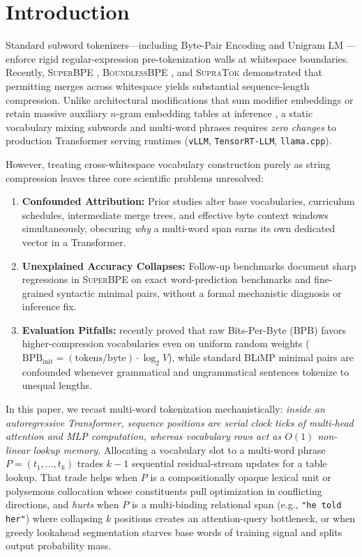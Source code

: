 \documentclass[11pt,a4paper]{article}
\begin{document}
\section{Introduction}
Standard subword tokenizers---including Byte-Pair Encoding \citep{sennrich2016neural} and Unigram LM \citep{kudo2018subword}---enforce rigid regular-expression pre-tokenization walls at whitespace boundaries. Recently, \textsc{SuperBPE} \citep{liu2025superbpe}, \textsc{BoundlessBPE} \citep{schmidt2025boundless}, and \textsc{SupraTok} \citep{tanase2026supratok} demonstrated that permitting merges across whitespace yields substantial sequence-length compression. Unlike architectural modifications that sum modifier embeddings \citep{reif2025cobpe} or retain massive auxiliary $n$-gram embedding tables at inference \citep{huang2025overtokenized}, a static vocabulary mixing subwords and multi-word phrases requires \emph{zero changes} to production Transformer serving runtimes (\texttt{vLLM}, \texttt{TensorRT-LLM}, \texttt{llama.cpp}).

However, treating cross-whitespace vocabulary construction purely as string compression leaves three core scientific problems unresolved:
\begin{enumerate}
    \item \textbf{Confounded Attribution:} Prior studies alter base vocabularies, curriculum schedules, intermediate merge trees, and effective byte context windows simultaneously, obscuring \emph{why} a multi-word span earns its own dedicated vector in a Transformer.
    \item \textbf{Unexplained Accuracy Collapses:} Follow-up benchmarks document sharp regressions in \textsc{SuperBPE} on exact word-prediction benchmarks and fine-grained syntactic minimal pairs, without a formal mechanistic diagnosis or inference fix.
    \item \textbf{Evaluation Pitfalls:} \citet{schaeffer2026myths} recently proved that raw Bits-Per-Byte (BPB) favors higher-compression vocabularies even on uniform random weights ($\text{BPB}_{\text{init}} = (\text{tokens}/\text{byte}) \cdot \log_2 V$), while standard \textsc{BLiMP} minimal pairs \citep{warstadt2020blimp} are confounded whenever grammatical and ungrammatical sentences tokenize to unequal lengths.
\end{enumerate}

In this paper, we recast multi-word tokenization mechanistically: \emph{inside an autoregressive Transformer, sequence positions are serial clock ticks of multi-head attention and MLP computation, whereas vocabulary rows act as $O(1)$ non-linear lookup memory.} Allocating a vocabulary slot to a multi-word phrase $P=(t_1,\dots,t_k)$ trades $k-1$ sequential residual-stream updates for a table lookup. That trade helps when $P$ is a compositionally opaque lexical unit or polysemous collocation whose constituents pull optimization in conflicting directions, and \emph{hurts} when $P$ is a multi-binding relational span (e.g., \texttt{"he told her"}) where collapsing $k$ positions creates an attention-query bottleneck, or when greedy lookahead segmentation starves base words of training signal and splits output probability mass.
\end{document}
